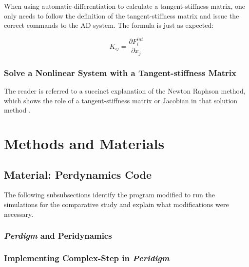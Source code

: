 \documentclass[preprint,12pt]{elsarticle}
\begin{document}
When using automatic-differentiation to calculate a tangent-stiffness matrix, one only needs to
follow the definition of the tangent-stiffness matrix and issue the correct commands to the AD
system. The formula is just as expected:

\begin{equation} K_{ij} = \frac{\partial F_i^{int}}{\partial x_j} \end{equation}

\subsubsection{Solve a Nonlinear System with a Tangent-stiffness Matrix} \label{solve_a_system}
The reader is referred to a succinct explanation of the Newton Raphson method, which shows the
role of a tangent-stiffness matrix or Jacobian in that solution method \cite[chap.
13]{young2009}. 

\section{Methods and Materials} 

\subsection{Material: Perdynamics Code}

The following subsubsections identify the program modified to run the simulations for the
comparative study and explain what modifications were necessary.

\subsubsection{\emph{Perdigm} and Peridynamics} 
\subsubsection{Implementing Complex-Step in \emph{Peridigm}} 
\end{document}
